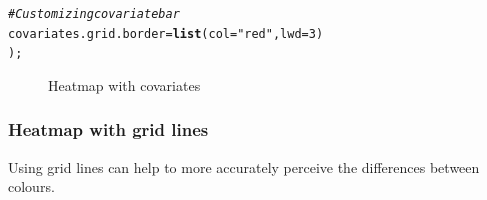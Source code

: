 \documentclass[letterpaper]{article}\usepackage[]{graphicx}\usepackage[]{color}
\makeatletter
\newcommand{\hlnum}[1]{\textcolor[rgb]{0.686,0.059,0.569}{#1}}%
\newcommand{\hlstr}[1]{\textcolor[rgb]{0.192,0.494,0.8}{#1}}%
\newcommand{\hlcom}[1]{\textcolor[rgb]{0.678,0.584,0.686}{\textit{#1}}}%
\newcommand{\hlstd}[1]{\textcolor[rgb]{0.345,0.345,0.345}{#1}}%
\newcommand{\hlkwc}[1]{\textcolor[rgb]{0.333,0.667,0.333}{#1}}%
\newcommand{\hlkwd}[1]{\textcolor[rgb]{0.737,0.353,0.396}{\textbf{#1}}}%
\newenvironment{kframe}{%
 \def\at@end@of@kframe{}%
 \ifinner\ifhmode%
  \def\at@end@of@kframe{\end{minipage}}%
  \begin{minipage}{\columnwidth}%
 \fi\fi%
 \def\FrameCommand##1{\hskip\@totalleftmargin \hskip-\fboxsep
 \colorbox{shadecolor}{##1}\hskip-\fboxsep
     \hskip-\linewidth \hskip-\@totalleftmargin \hskip\columnwidth}%
 \MakeFramed {\advance\hsize-\width
   \@totalleftmargin\z@ \linewidth\hsize
   \@setminipage}}%
 {\par\unskip\endMakeFramed%
 \at@end@of@kframe}
\newenvironment{knitrout}{}{} %
\makeatother
\begin{document}
\begin{knitrout}
\begin{kframe}
\begin{alltt}
    \hlcom{# Customizing covariate bar}
    \hlkwc{covariates.grid.border} \hlstd{=} \hlkwd{list}\hlstd{(}\hlkwc{col} \hlstd{=} \hlstr{"red"}\hlstd{,} \hlkwc{lwd} \hlstd{=} \hlnum{3}\hlstd{)}
    \hlstd{);}
\end{alltt}
\end{kframe}\begin{figure}[]


{\centering {} 

}

\caption[Heatmap with covariates]{Heatmap with covariates\label{fig:heatmap5}}
\end{figure}


\end{knitrout}

\subsubsection{Heatmap with grid lines}
Using grid lines can help to more accurately perceive the differences between colours.
\end{document}

